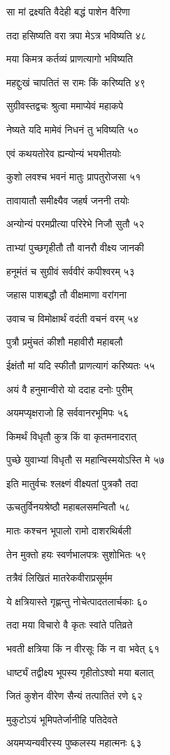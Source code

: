 सा मां द्रक्ष्यति वैदेही बद्धं पाशेन वैरिणा

तदा हसिष्यति वरा त्रपा मेऽत्र भविष्यति ४८

मया किमत्र कर्तव्यं प्राणत्यागो भविष्यति

महद्दुःखं चापतितं स रामः किं करिष्यति ४९

सुग्रीवस्तद्वचः श्रुत्वा ममाप्येवं महाकपे

नेष्यते यदि मामेवं निधनं तु भविष्यति ५०

एवं कथयतोरेव ह्यन्योन्यं भयभीतयोः

कुशो लवश्च भवनं मातुः प्रापतुरोजसा ५१

तावायातौ समीक्ष्यैव जहर्ष जननी तयोः

अन्योन्यं परमप्रीत्या परिरेभे निजौ सुतौ ५२

ताभ्यां पुच्छगृहीतौ तौ वानरौ वीक्ष्य जानकी

हनूमंतं च सुग्रीवं सर्ववीरं कपीश्वरम् ५३

जहास पाशबद्धौ तौ वीक्षमाणा वरांगना

उवाच च विमोक्षार्थं वदंती वचनं वरम् ५४

पुत्रौ प्रमुंचतं कीशौ महावीरौ महाबलौ

ईक्षंतौ मां यदि स्फीतौ प्राणत्यागं करिष्यतः ५५

अयं वै हनुमान्वीरो यो ददाह दनोः पुरीम्

अयमप्यृक्षराजो हि सर्ववानरभूमिपः ५६

किमर्थं विधृतौ कुत्र किं वा कृतमनादरात्

पुच्छे युवाभ्यां विधृतौ स महान्विस्मयोऽस्ति मे ५७

इति मातुर्वचः श्लक्ष्णं वीक्ष्यतां पुत्रकौ तदा

ऊचतुर्विनयश्रेष्ठौ महाबलसमन्वितौ ५८

मातः कश्चन भूपालो रामो दाशरथिर्बली

तेन मुक्तो हयः स्वर्णभालपत्रः सुशोभितः ५९

तत्रैवं लिखितं मातरेकवीराप्रसूर्मम

ये क्षत्रियास्ते गृह्णन्तु नोचेत्पादतलार्चकाः ६०

तदा मया विचारो वै कृतः स्वांते पतिव्रते

भवती क्षत्रिया किं न वीरसूः किं न वा भवेत् ६१

धार्ष्ट्यं तद्वीक्ष्य भूपस्य गृहीतोऽश्वो मया बलात्

जितं कुशेन वीरेण सैन्यं तत्पातितं रणे ६२

मुकुटोऽयं भूमिपतेर्जानीहि पतिदेवते

अयमप्यन्यवीरस्य पुष्कलस्य महात्मनः ६३

